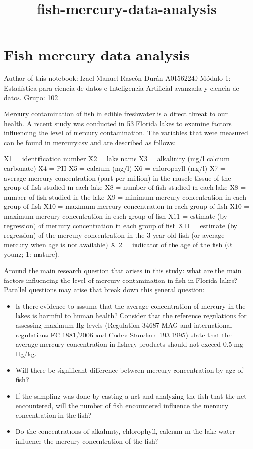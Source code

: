\documentclass[11pt]{article}
\title{fish-mercury-data-analysis}
\providecommand{\tightlist}{%
      \setlength{\itemsep}{0pt}\setlength{\parskip}{0pt}}
\begin{document}
    
    \maketitle
    
    

    
    \hypertarget{fish-mercury-data-analysis}{%
\section{Fish mercury data analysis}\label{fish-mercury-data-analysis}}

Author of this notebook: Izael Manuel Rascón Durán A01562240 Módulo 1:
Estadística para ciencia de datos e Inteligencia Artificial avanzada y
ciencia de datos. Grupo: 102

Mercury contamination of fish in edible freshwater is a direct threat to
our health. A recent study was conducted in 53 Florida lakes to examine
factors influencing the level of mercury contamination. The variables
that were measured can be found in mercury.csv and are described as
follows:

X1 = identification number X2 = lake name X3 = alkalinity (mg/l calcium
carbonate) X4 = PH X5 = calcium (mg/l) X6 = chlorophyll (mg/l) X7 =
average mercury concentration (part per million) in the muscle tissue of
the group of fish studied in each lake X8 = number of fish studied in
each lake X8 = number of fish studied in the lake X9 = minimum mercury
concentration in each group of fish X10 = maximum mercury concentration
in each group of fish X10 = maximum mercury concentration in each group
of fish X11 = estimate (by regression) of mercury concentration in each
group of fish X11 = estimate (by regression) of the mercury
concentration in the 3-year-old fish (or average mercury when age is not
available) X12 = indicator of the age of the fish (0: young; 1: mature).

Around the main research question that arises in this study: what are
the main factors influencing the level of mercury contamination in fish
in Florida lakes? Parallel questions may arise that break down this
general question:

\begin{itemize}
\tightlist
\item
  Is there evidence to assume that the average concentration of mercury
  in the lakes is harmful to human health? Consider that the reference
  regulations for assessing maximum Hg levels (Regulation 34687-MAG and
  international regulations EC 1881/2006 and Codex Standard 193-1995)
  state that the average mercury concentration in fishery products
  should not exceed 0.5 mg Hg/kg.
\item
  Will there be significant difference between mercury concentration by
  age of fish?
\item
  If the sampling was done by casting a net and analyzing the fish that
  the net encountered, will the number of fish encountered influence the
  mercury concentration in the fish?
\item
  Do the concentrations of alkalinity, chlorophyll, calcium in the lake
  water influence the mercury concentration of the fish?
\end{itemize}
\end{document}
